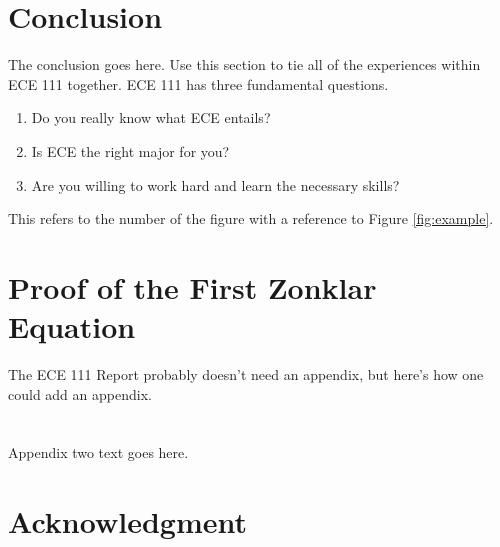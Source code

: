 \documentclass[journal]{IEEEtran}
\begin{document}


\section{Conclusion}
The conclusion goes here. Use this section to tie all of the experiences within ECE 111 together.  ECE 111 has three fundamental questions.  
\begin{enumerate}
\item Do you really know what ECE entails?  
\item Is ECE the right major for you?
\item Are you willing to work hard and learn the necessary skills?
\end{enumerate}
This refers to the number of the figure with a reference to Figure \ref{fig:example}.

%
\appendices
\section{Proof of the First Zonklar Equation}
The ECE 111 Report probably doesn't need an appendix, but here's how one could add an appendix.

\section{}
Appendix two text goes here.


\section*{Acknowledgment}
\end{document}

